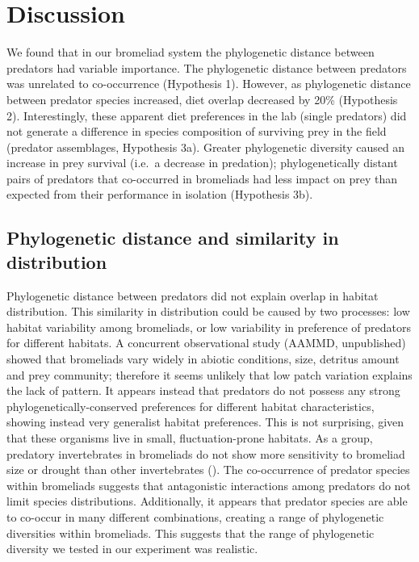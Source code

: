 \documentclass[11pt]{article}
\begin{document}

\section*{Discussion}

We found that in our bromeliad system the phylogenetic distance between
predators had variable importance. The phylogenetic distance between
predators was unrelated to co-occurrence (Hypothesis 1). However, as
phylogenetic distance between predator species increased, diet overlap
decreased by 20\% (Hypothesis 2). Interestingly, these apparent diet
preferences in the lab (single predators) did not generate a difference in species
composition of surviving prey in the field (predator assemblages, Hypothesis 3a). Greater
phylogenetic diversity caused an increase in prey survival (i.e.~a
decrease in predation); phylogenetically distant pairs of predators that
co-occurred in bromeliads had less impact on prey than expected from
their performance in isolation (Hypothesis 3b).

\subsection*{Phylogenetic distance and similarity in distribution}

Phylogenetic distance between predators did not explain overlap in
habitat distribution. This similarity in distribution could be caused by
two processes: low habitat variability among bromeliads, or low
variability in preference of predators for different habitats. A
concurrent observational study (AAMMD, unpublished) showed that
bromeliads vary widely in abiotic conditions, size, detritus amount and
prey community; therefore it seems unlikely that low patch variation
explains the lack of pattern. It appears instead that predators do not
possess any strong phylogenetically-conserved preferences for different
habitat characteristics, showing instead very generalist habitat
preferences. This is not surprising, given that these organisms live in
small, fluctuation-prone habitats. As a group, predatory invertebrates
in bromeliads do not show more sensitivity to bromeliad size or drought
than other invertebrates (\citealt{Amundrud2015}). The co-occurrence of
predator species within bromeliads suggests that antagonistic
interactions among predators do not limit species distributions.
Additionally, it appears that predator species are able to co-occur in
many different combinations, creating a range of phylogenetic
diversities within bromeliads. This suggests that the range of
phylogenetic diversity we tested in our experiment was realistic.
\end{document}
